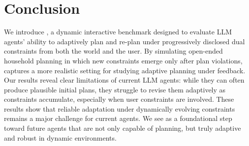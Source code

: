 \section{Conclusion}

We introduce \bench{}, a dynamic interactive benchmark designed to evaluate LLM agents’ ability to adaptively plan and re-plan under progressively disclosed dual constraints from both the world and the user. 
By simulating open-ended household planning in which new constraints emerge only after plan violations, \bench{} captures a more realistic setting for studying adaptive planning under feedback. 
Our results reveal clear limitations of current LLM agents: while they can often produce plausible initial plans, they struggle to revise them adaptively as constraints accumulate, especially when user constraints are involved. 
These results show that reliable adaptation under dynamically evolving constraints remains a major challenge for current agents.
We see \bench{} as a foundational step toward future agents that are not only capable of planning, but truly adaptive and robust in dynamic environments.